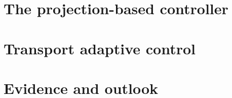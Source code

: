 \documentclass[11pt]{article}
\begin{document}


\clearpage
\tableofcontents
\clearpage



\clearpage
\part{The projection-based controller}


\clearpage
\part{Transport adaptive control}

















\clearpage
\part{Evidence and outlook}



\appendix



\end{document}
